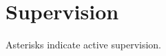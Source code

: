 \documentclass[letterpaper]{article}
\renewenvironment{itemize}{
  \begin{list}{}{
    \setlength{\leftmargin}{1.5em}
  }
}{
  \end{list}
}
\begin{document}



 
 



\section*{Supervision}

Asterisks indicate active supervision.
\end{document}
